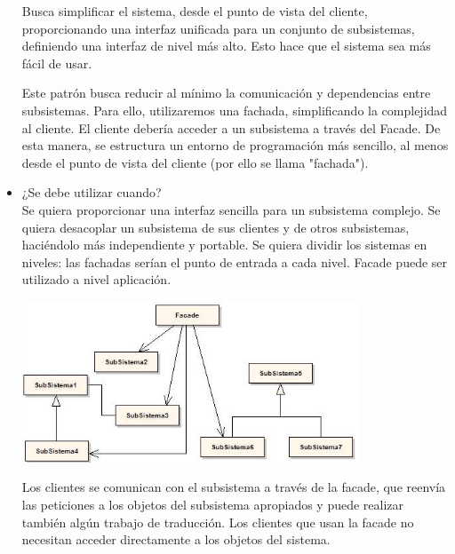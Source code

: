 \begin{flushleft}
\begin{itemize}
Busca simplificar el sistema, desde el punto de vista del cliente, proporcionando una interfaz unificada para un conjunto de subsistemas, definiendo una interfaz de nivel más alto. Esto hace que el sistema sea más fácil de usar.

Este patrón busca reducir al mínimo la comunicación y dependencias entre subsistemas. Para ello, utilizaremos una fachada, simplificando la complejidad al cliente. El cliente debería acceder a un subsistema a través del Facade. De esta manera, se estructura un entorno de programación más sencillo, al menos desde el punto de vista del cliente (por ello se llama "fachada").


         \item ¿Se debe utilizar cuando?
	\\ Se quiera proporcionar una interfaz sencilla para un subsistema complejo.
             Se quiera desacoplar un subsistema de sus clientes y de otros subsistemas, haciéndolo más independiente y portable.
            Se quiera dividir los sistemas en niveles: las fachadas serían el punto de entrada a cada nivel. Facade puede ser utilizado a nivel aplicación.
	\begin{center}
	\includegraphics[width=10cm]{./Imagenes/3} 
	\end{center}

Los clientes se comunican con el subsistema a través de la facade, que reenvía las peticiones a los objetos del subsistema apropiados y puede realizar también algún trabajo de traducción. Los clientes que usan la facade no necesitan acceder directamente a los objetos del sistema.	
	

\end{itemize} 


\end{flushleft}